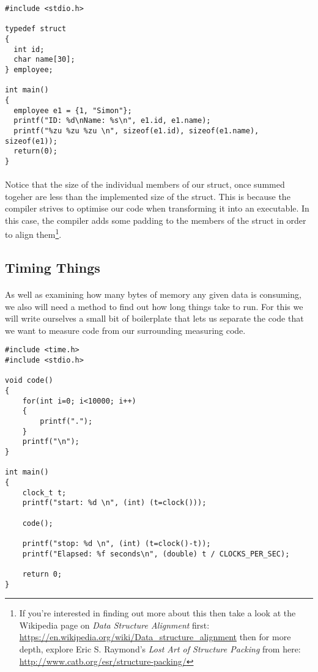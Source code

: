 \documentclass[10pt, a4paper, twosize]{article}
\begin{document}
\begin{lstlisting}
#include <stdio.h>    

typedef struct
{
  int id;
  char name[30];  
} employee;

int main()
{
  employee e1 = {1, "Simon"};
  printf("ID: %d\nName: %s\n", e1.id, e1.name);
  printf("%zu %zu %zu \n", sizeof(e1.id), sizeof(e1.name), sizeof(e1));
  return(0);
}
\end{lstlisting}

\paragraph{} Notice that the size of the individual members of our struct, once summed togeher are less than the implemented size of the struct. This is because the compiler strives to optimise our code when transforming it into an executable. In this case, the compiler adds some padding to the members of the struct in order to align them\footnote{If you're interested in finding out more about this then take a look at the Wikipedia page on \emph{Data Structure Alignment} first: \url{https://en.wikipedia.org/wiki/Data_structure_alignment} then for more depth, explore Eric S. Raymond's \emph{Lost Art of Structure Packing} from here: \url{http://www.catb.org/esr/structure-packing/}}.

\subsection{Timing Things}
\paragraph{} As well as examining how many bytes of memory any given data is consuming, we also will need a method to find out how long things take to run. For this we will write ourselves a small bit of boilerplate that lets us separate the code that we want to measure code from our surrounding measuring code.

\begin{lstlisting}
#include <time.h>
#include <stdio.h>

void code()
{
    for(int i=0; i<10000; i++)
    {
        printf(".");
    }    
    printf("\n");
}

int main()
{
    clock_t t;
    printf("start: %d \n", (int) (t=clock()));

    code();

    printf("stop: %d \n", (int) (t=clock()-t));
    printf("Elapsed: %f seconds\n", (double) t / CLOCKS_PER_SEC);

    return 0;
}
\end{lstlisting}
\end{document}
